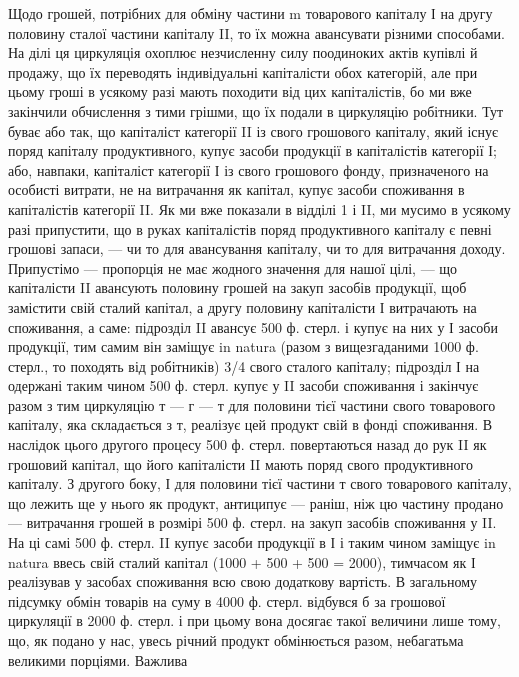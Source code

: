 Щодо грошей, потрібних для обміну частини m товарового капіталу
І на другу половину сталої частини капіталу II, то їх можна авансувати
різними способами. На ділі ця циркуляція охоплює незчисленну силу поодиноких
актів купівлі й продажу, що їх переводять індивідуальні капіталісти
обох категорій, але при цьому гроші в усякому разі мають походити
від цих капіталістів, бо ми вже закінчили обчислення з тими
грішми, що їх подали в циркуляцію робітники. Тут буває або так, що
капіталіст категорії II із свого грошового капіталу, який існує поряд капіталу
продуктивного, купує засоби продукції в капіталістів категорії І;
або, навпаки, капіталіст категорії І із свого грошового фонду, призначеного
на особисті витрати, не на витрачання як капітал, купує засоби
споживання в капіталістів категорії II. Як ми вже показали в відділі 1 і
II, ми мусимо в усякому разі припустити, що в руках капіталістів поряд
продуктивного капіталу є певні грошові запаси, — чи то для авансування
капіталу, чи то для витрачання доходу. Припустімо — пропорція не має
жодного значення для нашої цілі, — що капіталісти II авансують половину
грошей на закуп засобів продукції, щоб замістити свій сталий капітал,
а другу половину капіталісти І витрачають на споживання, а саме: підрозділ
II авансує 500 ф. стерл. і купує на них у І засоби продукції,
тим самим він заміщує in natura (разом з вищезгаданими 1000 ф. стерл.,
то походять від робітників) 3/4 свого сталого капіталу; підрозділ І на
одержані таким чином 500 ф. стерл. купує у II засоби споживання
і закінчує разом з тим циркуляцію т — г — т для половини тієї частини
свого товарового капіталу, яка складається з т, реалізує цей продукт
свій в фонді споживання. В наслідок цього другого процесу 500 ф. стерл.
повертаються назад до рук II як грошовий капітал, що його капіталісти
II мають поряд свого продуктивного капіталу. З другого боку, І для
половини тієї частини т свого товарового капіталу, що лежить ще у
нього як продукт, антиципує — раніш, ніж цю частину продано — витрачання
грошей в розмірі 500 ф. стерл. на закуп засобів споживання у II.
На ці самі 500 ф. стерл. II купує засоби продукції в І і таким чином
заміщує in natura ввесь свій сталий капітал (1000 + 500 + 500 = 2000),
тимчасом як І реалізував у засобах споживання всю свою додаткову
вартість. В загальному підсумку обмін товарів на суму в 4000 ф. стерл.
відбувся б за грошової циркуляції в 2000 ф. стерл. і при цьому вона
досягає такої величини лише тому, що, як подано у нас, увесь річний
продукт обмінюється разом, небагатьма великими порціями. Важлива
